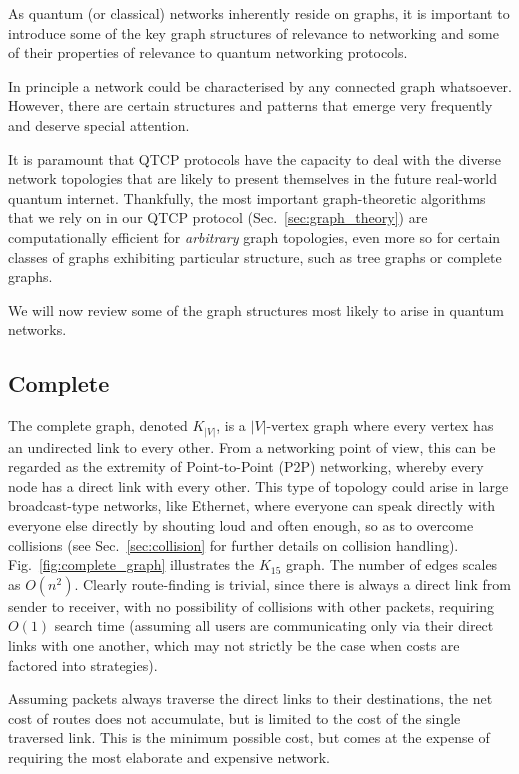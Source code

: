 \documentclass[aps,rmp,twocolumn,amsmath,amssymb,nofootinbib,superscriptaddress]{revtex4}
\begin{document}
As quantum (or classical) networks inherently reside on graphs, it is important to introduce some of the key graph structures of relevance to networking and some of their properties of relevance to quantum networking protocols.

In principle a network could be characterised by any connected graph whatsoever. However, there are certain structures and patterns that emerge very frequently and deserve special attention.

It is paramount that QTCP protocols have the capacity to deal with the diverse network topologies that are likely to present themselves in the future real-world quantum internet. Thankfully, the most important graph-theoretic algorithms that we rely on in our QTCP protocol (Sec.~\ref{sec:graph_theory}) are computationally efficient for \emph{arbitrary} graph topologies, even more so for certain classes of graphs exhibiting particular structure, such as tree graphs or complete graphs.

We will now review some of the graph structures most likely to arise in quantum networks.

%
%

\subsection{Complete}

The complete graph, denoted $K_{|V|}$, is a $|V|$-vertex graph where every vertex has an undirected link to every other. From a networking point of view, this can be regarded as the extremity of Point-to-Point (P2P) networking, whereby every node has a direct link with every other. This type of topology could arise in large broadcast-type networks, like Ethernet, where everyone can speak directly with everyone else directly by shouting loud and often enough, so as to overcome collisions (see Sec.~\ref{sec:collision} for further details on collision handling). Fig.~\ref{fig:complete_graph} illustrates the $K_{15}$ graph. The number of edges scales as $O(n^2)$. Clearly route-finding is trivial, since there is always a direct link from sender to receiver, with no possibility of collisions with other packets, requiring $O(1)$ search time (assuming all users are communicating only via their direct links with one another, which may not strictly be the case when costs are factored into strategies).

Assuming packets always traverse the direct links to their destinations, the net cost of routes does not accumulate, but is limited to the cost of the single traversed link. This is the minimum possible cost, but comes at the expense of requiring the most elaborate and expensive network.
\end{document}
